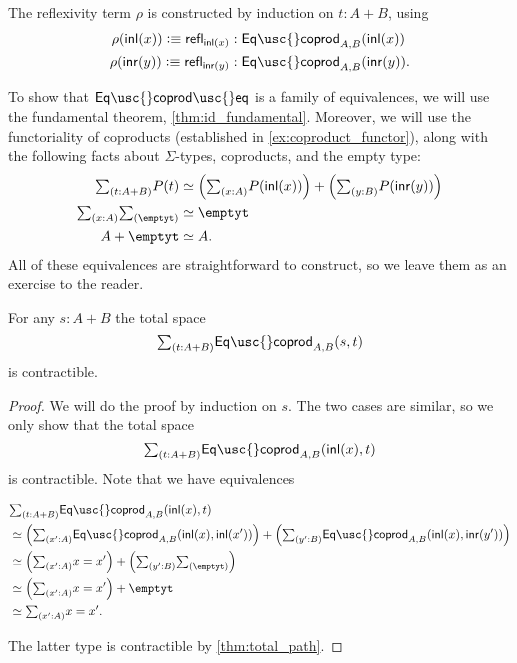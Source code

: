 \begin{constr}
The reflexivity term $\rho$ is constructed by induction on $t:A+B$, using
\begin{align*}
\rho(\inl(x))\defeq \refl{\inl(x)}  & : \mathsf{Eq\usc{}coprod}_{A,B}(\inl(x)) \\
\rho(\inr(y))\defeq \refl{\inr(y)} & : \mathsf{Eq\usc{}coprod}_{A,B}(\inr(y)).\qedhere
\end{align*}
\end{constr}

To show that $\mathsf{Eq\usc{}coprod\usc{}eq}$ is a family of equivalences, we will use the fundamental theorem, \cref{thm:id_fundamental}. Moreover, we will use the functoriality of coproducts (established in \cref{ex:coproduct_functor}), along with the following facts about $\Sigma$-types, coproducts, and the empty type:
\begin{align*}
\sm{t:A+B}P(t) & \eqvsym \Big(\sm{x:A}P(\inl(x))\Big)+\Big(\sm{y:B}P(\inr(y))\Big)\\
\sm{x:A}\emptyt & \eqvsym \emptyt \\
A+\emptyt & \eqvsym A.
\end{align*}
All of these equivalences are straightforward to construct, so we leave them as an exercise to the reader. 

\begin{lem}\label{lem:is-contr-total-eq-coprod}
For any $s:A+B$ the total space
\begin{equation*}
\sm{t:A+B}\mathsf{Eq\usc{}coprod}_{A,B}(s,t)
\end{equation*}
is contractible.
\end{lem}

\begin{proof}
We will do the proof by induction on $s$. The two cases are similar, so we only show that the total space
\begin{equation*}
\sm{t:A+B}\mathsf{Eq\usc{}coprod}_{A,B}(\inl(x),t)
\end{equation*}
is contractible. Note that we have equivalences
\begin{samepage}
\begin{align*}
& \sm{t:A+B}\mathsf{Eq\usc{}coprod}_{A,B}(\inl(x),t) \\
& \eqvsym \Big(\sm{x':A}\mathsf{Eq\usc{}coprod}_{A,B}(\inl(x),\inl(x'))\Big)+\Big(\sm{y':B}\mathsf{Eq\usc{}coprod}_{A,B}(\inl(x),\inr(y'))\Big) \\
& \eqvsym \Big(\sm{x':A}x=x'\Big)+\Big(\sm{y':B}\emptyt\Big) \\
& \eqvsym \Big(\sm{x':A}x=x'\Big)+\emptyt \\
& \eqvsym \sm{x':A}x=x'.
\end{align*}%
\end{samepage}%
The latter type is contractible by \cref{thm:total_path}.
\end{proof}

